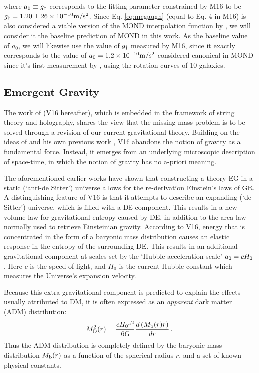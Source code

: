 \documentclass[usenatbib]{mnras}
\newcommand*{\E}[1]{\times 10^{#1}}
\newcommand{\un}[1]{_{\rm #1}}
\begin{document}
where $a_0 \equiv g\un{\dagger}$ corresponds to the fitting parameter constrained by M16 to be $g\un{\dagger}=1.20\pm26\E{-10} {\rm m/s^2}$. Since Eq. \ref{eq:mcgaugh} (equal to Eq. 4 in M16) is also considered a viable version of the MOND interpolation function by \cite{milgrom2008}, we will consider it the baseline prediction of MOND in this work. As the baseline value of $a_0$, we will likewise use the value of $g\un{\dagger}$ measured by M16, since it exactly corresponds to the value of $a_0=1.2\E{-10} {\rm m/s^2}$ considered canonical in MOND since it's first measurement by \cite{begeman1991}, using the rotation curves of 10 galaxies.

\subsection{Emergent Gravity}
\label{sec:EG}

The work of \cite{verlinde2016} (V16 hereafter), which is embedded in the framework of string theory and holography, shares the view that the missing mass problem is to be solved through a revision of our current gravitational theory. Building on the ideas of \cite{jacobson1995,jacobson2016,padmanabhan2010,faulkner2015} and his own previous work \cite[]{verlinde2011}, V16 abandons the notion of gravity as a fundamental force. Instead, it emerges from an underlying microscopic description of space-time, in which the notion of gravity has no a-priori meaning.

The aforementioned earlier works have shown that constructing a theory EG in a static (`anti-de Sitter') universe allows for the re-derivation Einstein's laws of GR. A distinguishing feature of V16 is that it attempts to describe an expanding (`de Sitter') universe, which is filled with a DE component. This results in a new volume law for gravitational entropy caused by DE, in addition to the area law normally used to retrieve Einsteinian gravity. According to V16, energy that is concentrated in the form of a baryonic mass distribution causes an elastic response in the entropy of the surrounding DE. This results in an additional gravitational component at scales set by the `Hubble acceleration scale' $a\un{0} = c H_0$. Here $c$ is the speed of light, and $H_0$ is the current Hubble constant which measures the Universe's expansion velocity.

Because this extra gravitational component is predicted to explain the effects usually attributed to DM, it is often expressed as an \emph{apparent} dark matter (ADM) distribution:
\begin{equation}
M_{\rm D}^2 (r) = \frac{  cH_0 r^2}{6G} \frac{d\left( M_{\rm b}(r) r \right)}{dr} \, .
\label{eq:veg_mdm}
\end{equation}
Thus the ADM distribution is completely defined by the baryonic mass distribution $M\un{b}(r)$ as a function of the spherical radius $r$, and a set of known physical constants.
\end{document}
